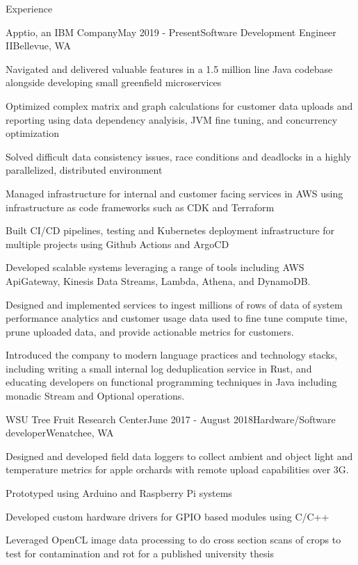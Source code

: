 \documentclass[
	11pt, %
]{resume} %
\begin{document}
\begin{rSection}{Experience}

   \begin{rSubsection}{Apptio, an IBM Company}{May 2019 - Present}{Software Development Engineer II}{Bellevue, WA}
        \item Navigated and delivered valuable features in a 1.5 million line Java codebase alongside developing small greenfield microservices
        \item Optimized complex matrix and graph calculations for customer data uploads and reporting using data dependency analyisis, JVM fine tuning, and concurrency optimization
        \item Solved difficult data consistency issues, race conditions and deadlocks in a highly parallelized, distributed environment
        \item Managed infrastructure for internal and customer facing services in AWS using infrastructure as code frameworks such as CDK and Terraform
        \item Built CI/CD pipelines, testing and Kubernetes deployment infrastructure for multiple projects using Github Actions and ArgoCD
        \item Developed scalable systems leveraging a range of tools including AWS ApiGateway, Kinesis Data Streams, Lambda, Athena, and DynamoDB.
        \item Designed and implemented services to ingest millions of rows of data of system performance analytics and customer usage data used to fine tune compute time, prune uploaded data, and provide actionable metrics for customers. 
        \item Introduced the company to modern language practices and technology stacks, including writing a small internal log deduplication service in Rust, and educating developers on functional programming techniques in Java including monadic Stream and Optional operations.
    \end{rSubsection}

    \begin{rSubsection}{WSU Tree Fruit Research Center}{June 2017 - August 2018}{Hardware/Software developer}{Wenatchee, WA}
        \item Designed and developed field data loggers to collect ambient and object light and temperature metrics for apple orchards with remote upload capabilities over 3G.
        \item Prototyped using Arduino and Raspberry Pi systems
        \item Developed custom hardware drivers for GPIO based modules using C/C++
        \item Leveraged OpenCL image data processing to do cross section scans of crops to test for contamination and rot for a published university thesis
    \end{rSubsection}

\end{rSection}
\end{document}
